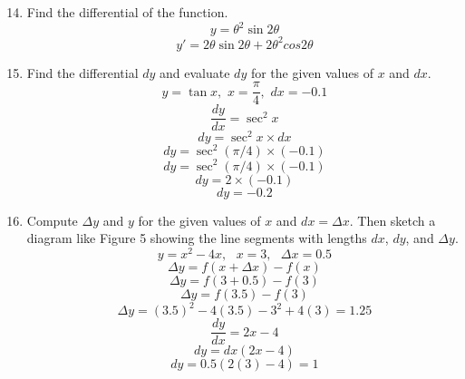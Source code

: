 \documentclass[12pt]{article}
\begin{document}
\begin{enumerate}
    \setcounter{enumi}{13}
    \item Find the differential of the function.
    \[y = \theta^2 \sin 2\theta\]
    \[\boxed{y' = 2\theta \sin 2\theta + 2\theta^2 cos2\theta }\]
    \setcounter{enumi}{18}
    \item Find the differential $dy$ and evaluate $dy$ for the given values of $x$ and $dx$.
    \[y = \tan x, \text{~}x = \frac{\pi}{4}, \text{~}dx = -0.1\]
    \[\frac{dy}{dx} = \sec^2 x\]
    \[dy = \sec^2 x \times dx\]
    \[dy = \sec^2 (\pi/4) \times (-0.1)\]
    \[dy = \sec^2 (\pi/4) \times (-0.1)\]
    \[dy = 2 \times (-0.1)\]
    \[\boxed{dy = -0.2}\]
    \setcounter{enumi}{22}
    \item Compute $\Delta y$ and $y$ for the given values of $x$ and $dx = \Delta x$. Then sketch a diagram like Figure 5 showing the line segments with lengths $dx$, $dy$, and $\Delta y$.
    \[y = x^2 - 4x, \text{ } x = 3, \text{ } \Delta x = 0.5\]
    \[\Delta y = f(x + \Delta x) - f(x)\]
    \[\Delta y = f(3 + 0.5) - f(3)\]
    \[\Delta y = f(3.5) - f(3)\]
    \[\boxed{\Delta y = (3.5)^2  - 4(3.5) - 3^2 + 4(3) = 1.25}\]
    \[\frac{dy}{dx} = 2x - 4\]
    \[dy = dx(2x - 4)\]
    \[\boxed{dy = 0.5(2(3) - 4) = 1}\]
    \begin{figure}[!h]
        \begin{framed}
            \centering
        \end{framed}
    \end{figure}
\end{enumerate}
\end{document}
